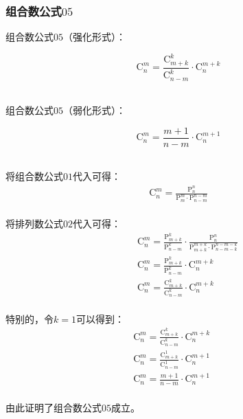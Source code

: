 \documentclass[UTF8]{ctexart}
\newcommand{\Pe}{\mathrm{P}}
\newcommand{\Co}{\mathrm{C}}
\begin{document}
\subsubsection{组合数公式$05$}
    组合数公式$05$（强化形式）：
    \begin{large}
        \begin{equation*}
            \Co_n^m=\frac{\Co_{m+k}^k}{\Co_{n-m}^k}\cdot\Co_n^{m+k}
        \end{equation*}
    \end{large}\\
    组合数公式$05$（弱化形式）：
    \begin{large}
        \begin{equation*}
            \Co_n^m=\frac{m+1}{n-m}\cdot\Co_n^{m+1}
        \end{equation*}
    \end{large}\\
    将组合数公式$01$代入可得：
    \setcounter{equation}{0}
    \begin{align}
        \Co_n^m=\frac{\Pe_n^n}{\Pe_m^m\cdot\Pe_{n-m}^{n-m}}
    \end{align}\\
    将排列数公式$02$代入可得：
    \begin{align}
        &~~~~~\Co_n^m=\frac{\Pe_{m+k}^k}{\Pe_{n-m}^k}\cdot\frac{\Pe_n^n}{\Pe_{m+k}^{m+k}\cdot\Pe_{n-m-k}^{n-m-k}}\\[3mm]
        &~~~~~\Co_n^m=\frac{\Pe_{m+k}^k}{\Pe_{n-m}^k}\cdot\Co_n^{m+k}\\[3mm]
        &~~~~~\Co_n^m=\frac{\Co_{m+k}^k}{\Co_{n-m}^k}\cdot\Co_n^{m+k}
    \end{align}\\
    特别的，令$k=1$可以得到：
    \begin{align}
        &\Co_n^m=\frac{\Co_{m+k}^k}{\Co_{n-m}^k}\cdot\Co_n^{m+k}~~~~~~~~~~\\[3mm]
        &\Co_n^m=\frac{\Co_{m+k}^1}{\Co_{n-m}^1}\cdot\Co_n^{m+1}\\[3mm]
        &\Co_n^m=\frac{m+1}{n-m}\cdot\Co_n^{m+1}
    \end{align}\\
    由此证明了组合数公式$05$成立。

\newpage
\end{document}

